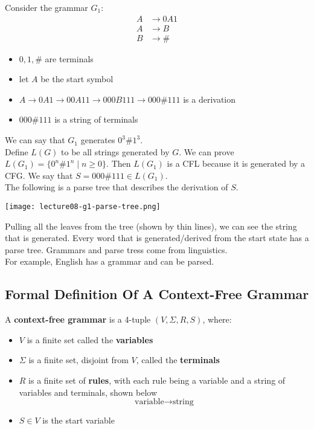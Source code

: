 \documentclass[11pt,a4paper]{article}
\begin{document}
\begin{example}
    Consider the grammar $G_1$:
    \begin{align*}
        A & \rightarrow 0A1 \\
        A & \rightarrow B \\
        B & \rightarrow\#
    \end{align*}

    \begin{itemize}
        \item $0,1,\#$ are terminals
        \item let $A$ be the start symbol
        \item $A\rightarrow 0A1\rightarrow 00A11\rightarrow 000B111\rightarrow 000\#111$ is a derivation
        \item $000\#111$ is a string of terminals
    \end{itemize}

    We can say that $G_1$ generates $0^3\#1^3$. \\

    Define $L(G)$ to be all strings generated by $G$. We can prove $L(G_1)=\{0^n\#1^n\mid n\geq 0\}$. Then $L(G_1)$ is a CFL because it is generated by a CFG.
    We say that $S=000\#111\in L(G_1).$ \\

    The following is a parse tree that describes the derivation of $S$.

    \texttt{[image: lecture08-g1-parse-tree.png]}

    Pulling all the leaves from the tree (shown by thin lines), we can see the string that is generated.
    Every word that is generated/derived from the start state has a parse tree.
    Grammars and parse tress come from linguistics. \\

    For example, English has a grammar and can be parsed.
\end{example}

\newpage
\subsection{Formal Definition Of A Context-Free Grammar}
\begin{definition}
    A \textbf{context-free grammar} is a 4-tuple $(V,\Sigma,R,S)$, where:
    \begin{itemize}
        \item $V$ is a finite set called the \textbf{variables}
        \item $\Sigma$ is a finite set, disjoint from $V$, called the \textbf{terminals}
        \item $R$ is a finite set of \textbf{rules}, with each rule being a variable and a string of variables and terminals, shown below
        $$\text{variable}\rightarrow\text{string}$$
        \item $S\in V$ is the start variable
    \end{itemize}
\end{definition}
\end{document}
